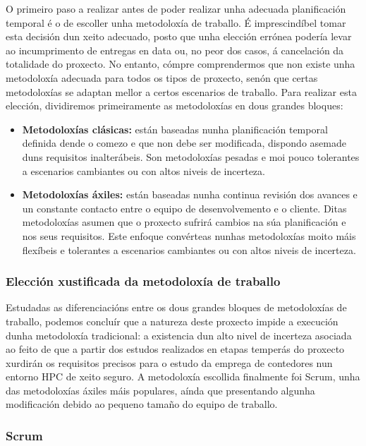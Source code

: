 O primeiro paso a realizar antes de poder realizar unha adecuada planificación temporal é o de escoller unha metodoloxía de traballo. É imprescindíbel tomar esta decisión dun xeito adecuado, posto que unha elección errónea podería levar ao incumprimento de entregas en data ou, no peor dos casos, á cancelación da totalidade do proxecto. No entanto, cómpre comprendermos que non existe unha metodoloxía adecuada para todos os tipos de proxecto, senón que certas metodoloxías se adaptan mellor a certos escenarios de traballo. Para realizar esta elección, dividiremos primeiramente as metodoloxías en dous grandes bloques:

\begin{itemize}
    \item \textbf{Metodoloxías clásicas:} están baseadas nunha planificación temporal definida dende o comezo e que non debe ser modificada, dispondo asemade duns requisitos inalterábeis. Son metodoloxías pesadas e moi pouco tolerantes a escenarios cambiantes ou con altos niveis de incerteza.
    \item \textbf{Metodoloxías áxiles:} están baseadas nunha continua revisión dos avances e un constante contacto entre o equipo de desenvolvemento e o cliente. Ditas metodoloxías asumen que o proxecto sufrirá cambios na súa planificación e nos seus requisitos. Este enfoque convérteas nunhas metodoloxías moito máis flexíbeis e tolerantes a escenarios cambiantes ou con altos niveis de incerteza.
\end{itemize}

\subsubsection{Elección xustificada da metodoloxía de traballo}

Estudadas as diferenciacións entre os dous grandes bloques de metodoloxías de traballo, podemos concluír que a natureza deste proxecto impide a execución dunha metodoloxía tradicional: a existencia dun alto nivel de incerteza asociada ao feito de que a partir dos estudos realizados en etapas temperás do proxecto xurdirán os requisitos precisos para o estudo da emprega de contedores nun entorno \gls{HPC} de xeito seguro. A metodoloxía escollida finalmente foi Scrum, unha das metodoloxías áxiles máis populares, aínda que presentando algunha modificación debido ao pequeno tamaño do equipo de traballo.

\subsubsection{Scrum}

